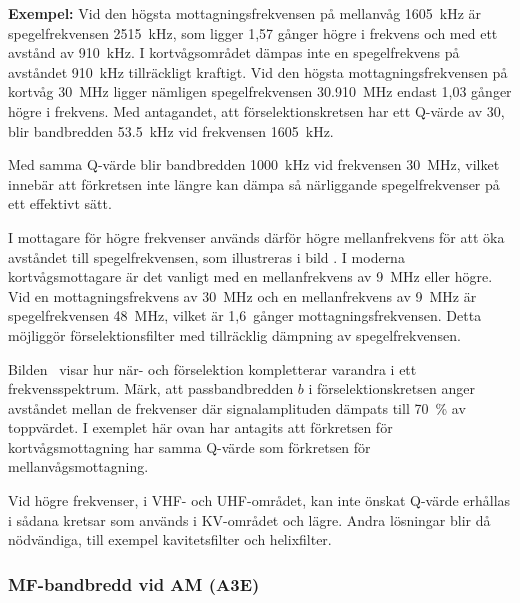\textbf{Exempel:}
Vid den högsta mottagningsfrekvensen på mellanvåg \qty{1605}{\kilo\hertz} är
spegelfrekvensen \qty{2515}{\kilo\hertz}, som ligger 1,57 gånger högre i frekvens
och med ett avstånd av \qty{910}{\kilo\hertz}.
I kortvågsområdet dämpas inte en spegelfrekvens på avståndet
\qty{910}{\kilo\hertz} tillräckligt kraftigt.
Vid den högsta mottagningsfrekvensen på kortvåg \qty{30}{\mega\hertz} ligger
nämligen spegelfrekvensen \qty{30,910}{\mega\hertz} endast 1,03 gånger högre i
frekvens.
Med antagandet, att förselektionskretsen har ett Q-värde av 30, blir
bandbredden \qty{53,5}{\kilo\hertz} vid frekvensen \qty{1605}{\kilo\hertz}.

Med samma Q-värde blir bandbredden \qty{1000}{\kilo\hertz} vid frekvensen
\qty{30}{\mega\hertz}, vilket innebär att förkretsen inte längre kan dämpa så
närliggande spegelfrekvenser på ett effektivt sätt.

I mottagare för högre frekvenser används därför högre mellanfrekvens
för att öka avståndet till spegelfrekvensen, som illustreras i bild
.
I moderna kortvågsmottagare är det vanligt med en mellanfrekvens av
\qty{9}{\mega\hertz} eller högre.
Vid en mottagningsfrekvens av \qty{30}{\mega\hertz} och en mellanfrekvens av
\qty{9}{\mega\hertz} är spegelfrekvensen \qty{48}{\mega\hertz}, vilket är
1,6~gånger mottagningsfrekvensen.
Detta möjliggör förselektionsfilter med tillräcklig dämpning av
spegelfrekvensen.


Bilden~ visar hur när- och förselektion kompletterar
varandra i ett frekvensspektrum.
Märk, att passbandbredden \(b\) i förselektionskretsen anger avståndet mellan
de frekvenser där signalamplituden dämpats till 70~\% av toppvärdet.
I exemplet här ovan har antagits att förkretsen för kortvågsmottagning har
samma Q-värde som förkretsen för mellanvågsmottagning.

Vid högre frekvenser, i VHF- och UHF-området, kan inte önskat Q-värde
erhållas i sådana kretsar som används i KV-området och lägre.
Andra lösningar blir då nödvändiga, till exempel kavitetsfilter och helixfilter.

\subsubsection{MF-bandbredd vid AM (A3E)}

